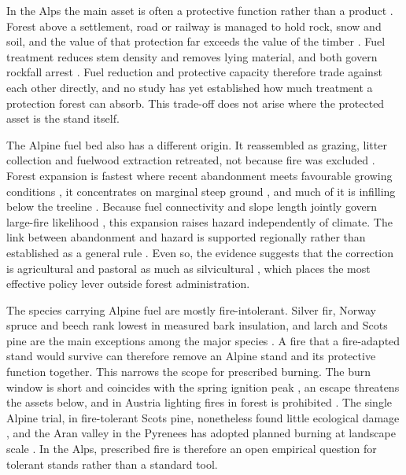\documentclass[11pt,a4paper]{article}
\begin{document}
In the Alps the main asset is often a protective function rather than a product \citep{dinca_timber_2025, jandl_management_2013}. Forest above a settlement, road or railway is managed to hold rock, snow and soil, and the value of that protection far exceeds the value of the timber \citep{accastello_asforesee_2019, moos_climate_2021}. Fuel treatment reduces stem density and removes lying material, and both govern rockfall arrest \citep{costa_biological_2021, moos_climate_2021}. Fuel reduction and protective capacity therefore trade against each other directly, and no study has yet established how much treatment a protection forest can absorb. This trade-off does not arise where the protected asset is the stand itself.

The Alpine fuel bed also has a different origin. It reassembled as grazing, litter collection and fuelwood extraction retreated, not because fire was excluded \citep{bebi_changes_2017}. Forest expansion is fastest where recent abandonment meets favourable growing conditions \citep{garbarino_contrasting_2020}, it concentrates on marginal steep ground \citep{gellrich_agricultural_2007}, and much of it is infilling below the treeline \citep{frei_evidence_2023}. Because fuel connectivity and slope length jointly govern large-fire likelihood \citep{conedera_linking_2024}, this expansion raises hazard independently of climate. The link between abandonment and hazard is supported regionally rather than established as a general rule \citep{mantero_influence_2020}. Even so, the evidence suggests that the correction is agricultural and pastoral as much as silvicultural \citep{lecinadiaz_incorporating_2023, spadoni_active_2023}, which places the most effective policy lever outside forest administration.

The species carrying Alpine fuel are mostly fire-intolerant. Silver fir, Norway spruce and beech rank lowest in measured bark insulation, and larch and Scots pine are the main exceptions among the major species \citep{dupire_vulnerability_2019, mutterer_bark_2026}. A fire that a fire-adapted stand would survive can therefore remove an Alpine stand and its protective function together. This narrows the scope for prescribed burning. The burn window is short and coincides with the spring ignition peak \citep{muller_forest_2020}, an escape threatens the assets below, and in Austria lighting fires in forest is prohibited \citep{neumann_fuel_2022}. The single Alpine trial, in fire-tolerant Scots pine, nonetheless found little ecological damage \citep{gamba_prescribed_2025}, and the Aran valley in the Pyrenees has adopted planned burning at landscape scale \citep{oliveres_path_2025}. In the Alps, prescribed fire is therefore an open empirical question for tolerant stands rather than a standard tool.
\end{document}
